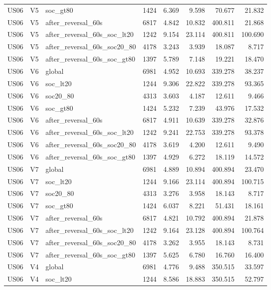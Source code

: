 \begin{tabular}{lllrrrrr}
US06 & V5 & soc\_gt80 & 1424 & 6.369 & 9.598 & 70.677 & 21.832 \\
US06 & V5 & after\_reversal\_60s & 6817 & 4.842 & 10.832 & 400.811 & 21.868 \\
US06 & V5 & after\_reversal\_60s\_soc\_lt20 & 1242 & 9.154 & 23.114 & 400.811 & 100.690 \\
US06 & V5 & after\_reversal\_60s\_soc20\_80 & 4178 & 3.243 & 3.939 & 18.087 & 8.717 \\
US06 & V5 & after\_reversal\_60s\_soc\_gt80 & 1397 & 5.789 & 7.148 & 19.221 & 18.470 \\
US06 & V6 & global & 6981 & 4.952 & 10.693 & 339.278 & 38.237 \\
US06 & V6 & soc\_lt20 & 1244 & 9.306 & 22.822 & 339.278 & 93.365 \\
US06 & V6 & soc20\_80 & 4313 & 3.603 & 4.187 & 12.611 & 9.466 \\
US06 & V6 & soc\_gt80 & 1424 & 5.232 & 7.239 & 43.976 & 17.532 \\
US06 & V6 & after\_reversal\_60s & 6817 & 4.911 & 10.639 & 339.278 & 32.876 \\
US06 & V6 & after\_reversal\_60s\_soc\_lt20 & 1242 & 9.241 & 22.753 & 339.278 & 93.378 \\
US06 & V6 & after\_reversal\_60s\_soc20\_80 & 4178 & 3.619 & 4.200 & 12.611 & 9.490 \\
US06 & V6 & after\_reversal\_60s\_soc\_gt80 & 1397 & 4.929 & 6.272 & 18.119 & 14.572 \\
US06 & V7 & global & 6981 & 4.889 & 10.894 & 400.894 & 23.470 \\
US06 & V7 & soc\_lt20 & 1244 & 9.166 & 23.114 & 400.894 & 100.715 \\
US06 & V7 & soc20\_80 & 4313 & 3.276 & 3.958 & 18.143 & 8.717 \\
US06 & V7 & soc\_gt80 & 1424 & 6.037 & 8.221 & 51.431 & 18.161 \\
US06 & V7 & after\_reversal\_60s & 6817 & 4.821 & 10.792 & 400.894 & 21.878 \\
US06 & V7 & after\_reversal\_60s\_soc\_lt20 & 1242 & 9.164 & 23.128 & 400.894 & 100.764 \\
US06 & V7 & after\_reversal\_60s\_soc20\_80 & 4178 & 3.262 & 3.955 & 18.143 & 8.731 \\
US06 & V7 & after\_reversal\_60s\_soc\_gt80 & 1397 & 5.625 & 6.780 & 16.760 & 16.400 \\
US06 & V4 & global & 6981 & 4.776 & 9.488 & 350.515 & 33.597 \\
US06 & V4 & soc\_lt20 & 1244 & 8.586 & 18.883 & 350.515 & 52.797 \\

\end{tabular}
